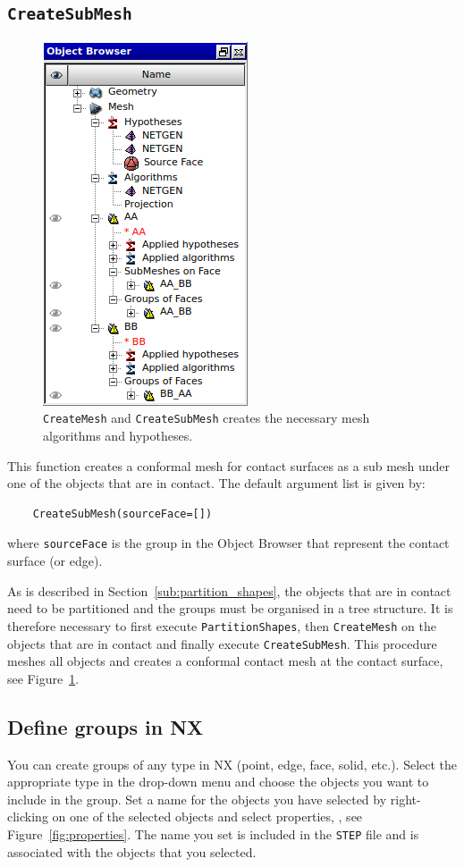 \documentclass[10pt,a4paper,notitlepage]{scrartcl}
\begin{document}
\subsection*{\texttt{CreateSubMesh}} %
\label{sub:create_sub_mesh}
\begin{figure}
	\centering
	\includegraphics{mesh}
	\caption{\texttt{CreateMesh} and \texttt{CreateSubMesh} creates the necessary mesh algorithms and hypotheses.}
	\label{fig:mesh}
\end{figure}
This function creates a conformal mesh for contact surfaces as a sub mesh under one of the objects that are in contact. The default argument list is given by:
\begin{lstlisting}
	CreateSubMesh(sourceFace=[])
\end{lstlisting}
where \texttt{sourceFace} is the group in the Object Browser that represent the contact surface (or edge).

As is described in Section~\ref{sub:partition_shapes}, the objects that are in contact need to be partitioned and the groups must be organised in a tree structure. It is therefore necessary to first execute \texttt{PartitionShapes}, then \texttt{CreateMesh} on the objects that are in contact and finally execute \texttt{CreateSubMesh}. This procedure meshes all objects and creates a conformal contact mesh at the contact surface, see Figure~\ref{fig:mesh}.

\subsection*{Define groups in NX} %
\label{sub:define_groups_in_nx}
You can create groups of any type in NX (point, edge, face, solid, etc.). Select the appropriate type in the drop-down menu  and choose the objects you want to include in the group. Set a name for the objects you have selected by right-clicking on one of the selected objects and select properties, , see Figure~\ref{fig:properties}. The name you set is included in the \texttt{STEP} file and is associated with the objects that you selected.
\end{document}
